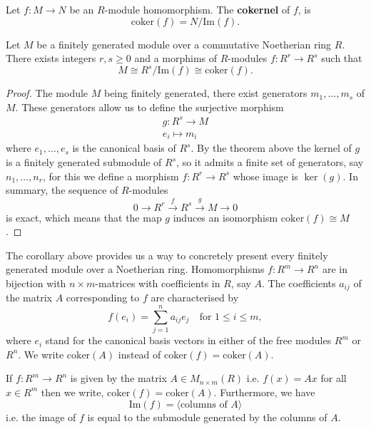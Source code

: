 \documentclass[12pt, a4paper]{article}
\begin{document}
\begin{definition}
    Let \( f: M \to N \) be an \( R \)-module homomorphism. The \textbf{cokernel} of \( f \), is
    \[
    \text{coker}(f) = N / \text{Im}(f).
    \]
\end{definition}

\begin{mdcor}
    Let \(M\) be a finitely generated module over a commutative Noetherian ring \(R\). There exists integers \(r,s\geq 0\) and a morphims of \(R\)-modules \(f:R^r\to R^s\) such that 
    \[M \cong R^s/\text{Im}(f) \cong \text{coker}(f).\]
\end{mdcor}

\begin{proof}
    The module \( M \) being finitely generated, there exist generators \( m_1, \ldots, m_s \) of \( M \). These generators allow us to define the surjective morphism 
    \[\begin{aligned}
        g:R^s \to M \\
        e_i \mapsto m_i
    \end{aligned}\] 
    where \(e_1,\ldots,e_s\) is the canonical basis of \(R^s\). By the theorem above the kernel of \( g \) is a finitely generated submodule of \( R^s \), so it admits a finite set of generators, say \( n_1, \ldots, n_r \), for this we define a morphism \( f : R^r \rightarrow R^s \) whose image is \(\ker(g) \). In summary, the sequence of \( R \)-modules
    \[ 0 \rightarrow R^r \xrightarrow{f} R^s \xrightarrow{g} M \rightarrow 0 \] is exact, which means that the map \( g \) induces an isomorphism \(\text{coker}(f) \cong M \).
\end{proof}

\begin{mdnote}
    The corollary above provides us a way to concretely present every finitely generated module over a Noetherian ring. Homomorphisms \(f:R^m \to R^n\) are in bijection with \(n\times m\)-matrices with coefficients in \(R\), say \(A\). The coefficients \(a_{ij}\) of the matrix \(A\) corresponding to \(f\) are characterised by 
    \[f(e_i) =\sum_{j=1}^n a_{ij}e_j \quad \text{for } 1\leq i \leq m,\]
    where \(e_i\) stand for the canonical basis vectors in either of the free modules \(R^m\) or \(R^n\). We write \(\text{coker}(A)\) instead of \(\text{coker}(f)=\text{coker}(A)\).
\end{mdnote}

\begin{mdprop}
    If \(f : R^m \to R^n\) is given by the matrix \(A \in M_{n\times m}(R)\) i.e. \(f(x)=Ax\) for all \(x\in R^m\) then we write, \(\text{coker}(f)=\text{coker}(A)\). Furthermore, we have 
    \[\text{Im}(f) = \langle \text{columns of } A\rangle\]
    i.e. the image of \(f\) is equal to the submodule generated by the columns of \(A\).
\end{mdprop}
\end{document}
